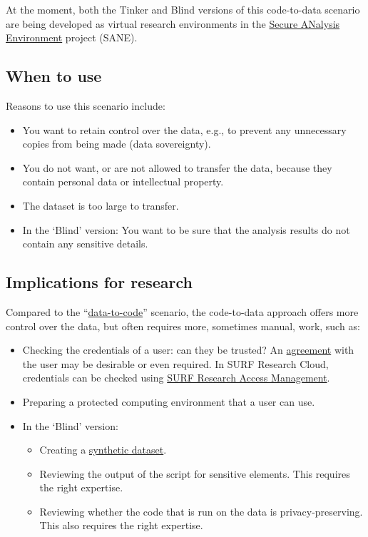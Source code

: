 \documentclass[
]{book}
\providecommand{\tightlist}{%
  \setlength{\itemsep}{0pt}\setlength{\parskip}{0pt}}
\begin{document}
At the moment, both the Tinker and Blind versions of this code-to-data scenario
are being developed as virtual research environments in the
\href{https://www.surf.nl/en/news/sane-secure-data-environment-for-social-sciences-and-humanities}{Secure ANalysis Environment}
project (SANE).

\hypertarget{when-to-use-1}{%
\subsection{When to use}\label{when-to-use-1}}

Reasons to use this scenario include:

\begin{itemize}
\tightlist
\item
  You want to retain control over the data, e.g., to prevent any unnecessary
  copies from being made (data sovereignty).
\item
  You do not want, or are not allowed to transfer the data, because they contain
  personal data or intellectual property.
\item
  The dataset is too large to transfer.
\item
  In the `Blind' version: You want to be sure that the analysis results do not
  contain any sensitive details.
\end{itemize}

\hypertarget{implications-for-research-1}{%
\subsection{Implications for research}\label{implications-for-research-1}}

Compared to the ``\protect\hyperlink{data-to-code}{data-to-code}'' scenario, the code-to-data
approach offers more control over the data, but often requires more, sometimes
manual, work, such as:

\begin{itemize}
\tightlist
\item
  Checking the credentials of a user: can they be trusted? An
  \protect\hyperlink{agreements}{agreement} with the user may be desirable or even required. In
  SURF Research Cloud, credentials can be checked using
  \href{https://www.surf.nl/en/surf-research-access-management-easy-and-secure-access-to-research-services}{SURF Research Access Management}.
\item
  Preparing a protected computing environment that a user can use.
\item
  In the `Blind' version:

  \begin{itemize}
  \tightlist
  \item
    Creating a \protect\hyperlink{synthetic-data}{synthetic dataset}.
  \item
    Reviewing the output of the script for sensitive elements. This requires
    the right expertise.
  \item
    Reviewing whether the code that is run on the data is privacy-preserving.
    This also requires the right expertise.
  \end{itemize}
\end{itemize}
\end{document}
